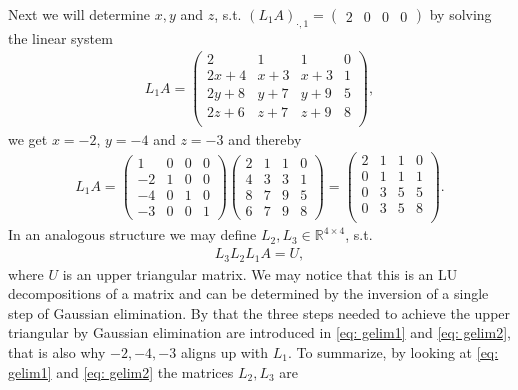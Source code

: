 Next we will determine $x, y$ and $z$, s.t. $(L_1A)_{\cdot, 1} =
\begin{pmatrix} 2 & 0 & 0 & 0 \end{pmatrix} $ by solving the linear
system
\begin{align}
    L_1 A =
    \begin{pmatrix}
        2    & 1 & 1 & 0 \\
        2x+4 & x+3 & x+3 & 1\\
        2y+8 & y+7 & y+9 & 5\\
        2z+6 & z+7 & z+9 & 8\\
    \end{pmatrix}
,\end{align}
we get $x = -2$, $y = -4$ and $z=-3$ and thereby
\begin{align}
    L_1 A =
     \begin{pmatrix}
         1 & 0 & 0 & 0\\
         -2 & 1 & 0 & 0\\
         -4 & 0 & 1 & 0\\
         -3 & 0 & 0 & 1
     \end{pmatrix}
    \begin{pmatrix}
        2 & 1 & 1 & 0 \\
        4 & 3 & 3 & 1 \\
        8 & 7 & 9 & 5 \\
        6 & 7 & 9 & 8
    \end{pmatrix}=
    \begin{pmatrix}
        2 & 1 & 1 & 0 \\
        0 & 1 & 1 & 1\\
        0 & 3 & 5 & 5\\
        0 & 3 & 5 & 8\\
    \end{pmatrix}
.\end{align}
In an analogous structure we may define $L_2, L_3 \in \mathbb{R}^{4\times4}$,
s.t.
\begin{align}
    L_3L_2L_1A=U,
\end{align}
where $U$ is an upper triangular matrix. We may notice that this is an LU
decompositions of a matrix and can be determined by the inversion of a
single step of Gaussian elimination. By that the three steps needed to
achieve the upper triangular by Gaussian elimination are introduced
in \ref{eq: gelim1} and \ref{eq: gelim2}, that is also why $-2, -4, -3$ aligns up with $L_1$.
To summarize, by looking at \ref{eq: gelim1} and \ref{eq: gelim2} the matrices $L_2, L_3$ are
